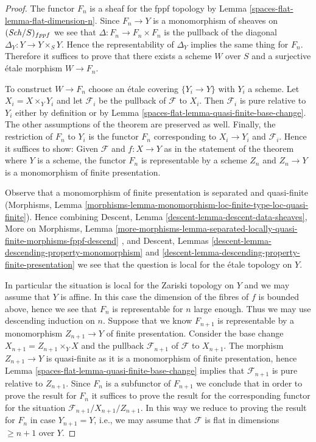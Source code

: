 \begin{proof}
The functor $F_n$ is a sheaf for the fppf topology by
Lemma \ref{spaces-flat-lemma-flat-dimension-n}.
Since $F_n \to Y$ is a monomorphism of sheaves on
$(\mathit{Sch}/S)_{fppf}$ we see that $\Delta : F_n \to F_n \times F_n$
is the pullback of the diagonal $\Delta_Y : Y \to Y \times_S Y$.
Hence the representability of $\Delta_Y$ implies the same
thing for $F_n$. Therefore it suffices to prove that
there exists a scheme $W$ over $S$ and a surjective \'etale morphism
$W \to F_n$.

\medskip\noindent
To construct $W \to F_n$ choose an \'etale covering $\{Y_i \to Y\}$
with $Y_i$ a scheme. Let $X_i = X \times_Y Y_i$ and let
$\mathcal{F}_i$ be the pullback of $\mathcal{F}$ to $X_i$.
Then $\mathcal{F}_i$ is pure relative to $Y_i$ either by definition
or by Lemma \ref{spaces-flat-lemma-quasi-finite-base-change}.
The other assumptions of the theorem are preserved as well.
Finally, the restriction of $F_n$ to $Y_i$ is
the functor $F_n$ corresponding to $X_i \to Y_i$ and $\mathcal{F}_i$.
Hence it suffices to show: Given $\mathcal{F}$ and $f : X \to Y$
as in the statement of the theorem where $Y$ is a scheme, the
functor $F_n$ is representable by a scheme $Z_n$ and
$Z_n \to Y$ is a monomorphism of finite presentation.

\medskip\noindent
Observe that a monomorphism of finite presentation is
separated and quasi-finite (Morphisms, Lemma
\ref{morphisms-lemma-monomorphism-loc-finite-type-loc-quasi-finite}).
Hence combining
Descent, Lemma \ref{descent-lemma-descent-data-sheaves},
More on Morphisms, Lemma
\ref{more-morphisms-lemma-separated-locally-quasi-finite-morphisms-fppf-descend}
, and
Descent, Lemmas \ref{descent-lemma-descending-property-monomorphism} and
\ref{descent-lemma-descending-property-finite-presentation}
we see that the question is local for the \'etale topology on $Y$.

\medskip\noindent
In particular the situation is local for the Zariski topology on $Y$
and we may assume that $Y$ is affine. In this case the dimension of the
fibres of $f$ is bounded above, hence we see that $F_n$ is representable
for $n$ large enough. Thus we may use descending induction on $n$.
Suppose that we know $F_{n + 1}$ is representable by a monomorphism
$Z_{n + 1} \to Y$ of finite presentation. Consider the base change
$X_{n + 1} = Z_{n + 1} \times_Y X$ and the pullback $\mathcal{F}_{n + 1}$
of $\mathcal{F}$ to $X_{n + 1}$. The morphism $Z_{n + 1} \to Y$ is
quasi-finite as it is a monomorphism of finite presentation, hence
Lemma \ref{spaces-flat-lemma-quasi-finite-base-change}
implies that $\mathcal{F}_{n + 1}$ is pure relative to $Z_{n + 1}$.
Since $F_n$ is a subfunctor of $F_{n + 1}$ we conclude that in order
to prove the result for $F_n$ it suffices to prove the result for the
corresponding functor for the situation
$\mathcal{F}_{n + 1}/X_{n + 1}/Z_{n + 1}$.
In this way we reduce to proving the result for $F_n$ in case
$Y_{n + 1} = Y$, i.e., we may assume that $\mathcal{F}$ is flat
in dimensions $\geq n + 1$ over $Y$.


\end{proof}
